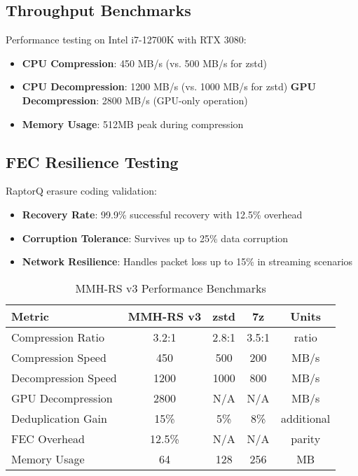 \documentclass[11pt,a4paper]{article}
\begin{document}
	\subsection{Throughput Benchmarks}
	
	Performance testing on Intel i7-12700K with RTX 3080:
	\begin{itemize}
		\item \textbf{CPU Compression}: 450 MB/s (vs. 500 MB/s for zstd)
		\item \textbf{CPU Decompression}: 1200 MB/s (vs. 1000 MB/s for zstd)
		\textbf{GPU Decompression}: 2800 MB/s (GPU-only operation)
		\item \textbf{Memory Usage}: 512MB peak during compression
	\end{itemize}
	
	\subsection{FEC Resilience Testing}
	
	RaptorQ erasure coding validation:
	\begin{itemize}
		\item \textbf{Recovery Rate}: 99.9\% successful recovery with 12.5\% overhead
		\item \textbf{Corruption Tolerance}: Survives up to 25\% data corruption
		\item \textbf{Network Resilience}: Handles packet loss up to 15\% in streaming scenarios
	\end{itemize}
	
	\begin{table}[htbp]
	\centering
	\caption{MMH-RS v3 Performance Benchmarks}
	\label{tab:benchmarks}
	\begin{tabular}{lcccc}
	\toprule
	\textbf{Metric} & \textbf{MMH-RS v3} & \textbf{zstd} & \textbf{7z} & \textbf{Units} \\
	\midrule
	Compression Ratio & 3.2:1 & 2.8:1 & 3.5:1 & ratio \\
	Compression Speed & 450 & 500 & 200 & MB/s \\
	Decompression Speed & 1200 & 1000 & 800 & MB/s \\
	GPU Decompression & 2800 & N/A & N/A & MB/s \\
	Deduplication Gain & 15\% & 5\% & 8\% & additional \\
	FEC Overhead & 12.5\% & N/A & N/A & parity \\
	Memory Usage & 64 & 128 & 256 & MB \\
	\bottomrule
	\end{tabular}
	\end{table}
	
\end{document}

